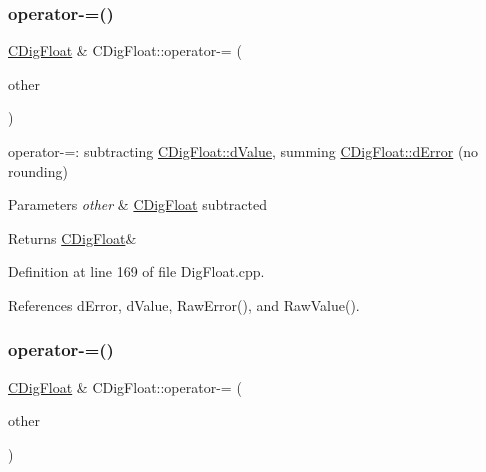 \subsubsection{\texorpdfstring{operator-\/=()}{operator-=()}\hspace{0.1cm}{\footnotesize\ttfamily [1/2]}}
{\footnotesize\ttfamily \hyperlink{classCDigFloat}{C\+Dig\+Float} \& C\+Dig\+Float\+::operator-\/= (\begin{DoxyParamCaption}\item[{const \hyperlink{classCDigFloat}{C\+Dig\+Float} \&}]{other }\end{DoxyParamCaption})}



operator-\/=\+: subtracting \hyperlink{classCDigFloat_a4bbe69e30dd4e20527362493aa9aaf96}{C\+Dig\+Float\+::d\+Value}, summing \hyperlink{classCDigFloat_a25eb3782d1e727ff007a48f8308e3d4d}{C\+Dig\+Float\+::d\+Error} (no rounding) 


\begin{DoxyParams}{Parameters}
{\em other} & \hyperlink{classCDigFloat}{C\+Dig\+Float} subtracted \\
\hline
\end{DoxyParams}
\begin{DoxyReturn}{Returns}
\hyperlink{classCDigFloat}{C\+Dig\+Float}\& 
\end{DoxyReturn}


Definition at line 169 of file Dig\+Float.\+cpp.



References d\+Error, d\+Value, Raw\+Error(), and Raw\+Value().

\mbox{\label{classCDigFloat_a783166f772c1d638b03eb62de27d775d}} 
\subsubsection{\texorpdfstring{operator-\/=()}{operator-=()}\hspace{0.1cm}{\footnotesize\ttfamily [2/2]}}
{\footnotesize\ttfamily \hyperlink{classCDigFloat}{C\+Dig\+Float} \& C\+Dig\+Float\+::operator-\/= (\begin{DoxyParamCaption}\item[{const double}]{other }\end{DoxyParamCaption})}



